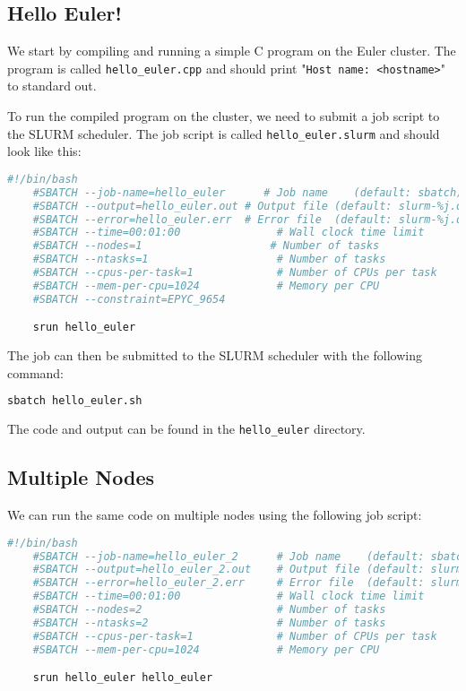 \documentclass[unicode,11pt,a4paper,oneside,numbers=endperiod,openany]{scrartcl}
\begin{document}
\subsection{Hello Euler!}

We start by compiling and running a simple C program on the Euler cluster. The program is called \texttt{hello\_euler.cpp} and should print "\texttt{Host name: <hostname>}" to standard out.

To run the compiled program on the cluster, we need to submit a job script to the SLURM scheduler. The job script is called \texttt{hello\_euler.slurm} and should look like this:

\begin{lstlisting}[language=bash,caption={Hello Euler Job Script}]
    #!/bin/bash
    #SBATCH --job-name=hello_euler      # Job name    (default: sbatch)
    #SBATCH --output=hello_euler.out # Output file (default: slurm-%j.out)
    #SBATCH --error=hello_euler.err  # Error file  (default: slurm-%j.out)
    #SBATCH --time=00:01:00               # Wall clock time limit
    #SBATCH --nodes=1                    # Number of tasks
    #SBATCH --ntasks=1                    # Number of tasks
    #SBATCH --cpus-per-task=1             # Number of CPUs per task
    #SBATCH --mem-per-cpu=1024            # Memory per CPU
    #SBATCH --constraint=EPYC_9654

    srun hello_euler
\end{lstlisting}

The job can then be submitted to the SLURM scheduler with the following command:
\begin{lstlisting}[language=bash]
    sbatch hello_euler.sh
\end{lstlisting}

The code and output can be found in the \texttt{hello\_euler} directory.

\subsection{Multiple Nodes}

We can run the same code on multiple nodes using the following job script:


\begin{lstlisting}[language=bash,caption={Hello Euler Job Script}]
    #!/bin/bash
    #SBATCH --job-name=hello_euler_2      # Job name    (default: sbatch)
    #SBATCH --output=hello_euler_2.out    # Output file (default: slurm-%j.out)
    #SBATCH --error=hello_euler_2.err     # Error file  (default: slurm-%j.out)
    #SBATCH --time=00:01:00               # Wall clock time limit
    #SBATCH --nodes=2                     # Number of tasks
    #SBATCH --ntasks=2                    # Number of tasks
    #SBATCH --cpus-per-task=1             # Number of CPUs per task
    #SBATCH --mem-per-cpu=1024            # Memory per CPU

    srun hello_euler hello_euler
\end{lstlisting}
\end{document}
